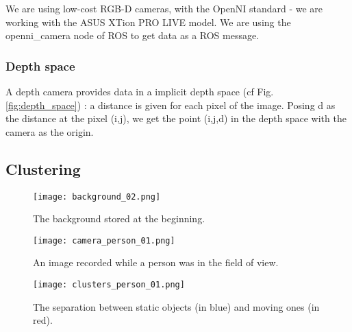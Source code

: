 \documentclass[smallextended]{svjour3}
\begin{document}
We are using low-cost RGB-D cameras, with the OpenNI standard - we are working with the ASUS XTion PRO LIVE model. We are using the openni\_camera node of ROS \cite{Refopenni} to get data as a ROS message.

\subsubsection{Depth space}
A depth camera provides data in a implicit depth space (cf Fig. \ref{fig:depth_space}) : a distance is given for each pixel of the image. Posing d as the distance at the pixel (i,j), we get the point (i,j,d) in the depth space with the camera as the origin.

\subsection{Clustering}

\begin{figure}
\centering
\texttt{[image: background\_02.png]}
\caption{\label{fig:background2}The background stored at the beginning.}
\end{figure}

\begin{figure}
\centering
\texttt{[image: camera\_person\_01.png]}
\caption{\label{fig:cameraperson1}An image recorded while a person was in the field of view.}
\end{figure}

\begin{figure}
\centering
\texttt{[image: clusters\_person\_01.png]}
\caption{\label{fig:clustersperson1}The separation between static objects (in blue) and moving ones (in red).}
\end{figure}
\end{document}
